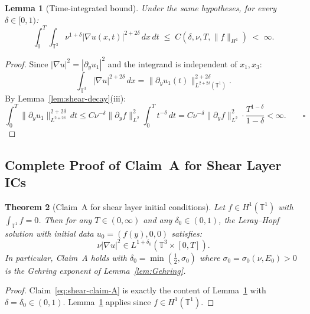 \documentclass[11pt]{article}
\newtheorem{theorem}{Theorem}[section]
\newtheorem{lemma}[theorem]{Lemma}
\theoremstyle{definition}
\theoremstyle{remark}
\newcommand{\T}{\mathbb{T}}
\begin{document}
\begin{lemma}[Time-integrated bound]
\label{lem:shear-Lp}
  Under the same hypotheses, for every $\delta\in[0,1)$:
  \[
    \int_0^T\!\!\int_{\T^3}\nu^{1+\delta}|\nabla u(x,t)|^{2+2\delta}\,dx\,dt
    \;\leq\; C(\delta,\nu,T,\|f\|_{H^1}) \;<\; \infty.
  \]
\end{lemma}

\begin{proof}
  Since $|\nabla u|^2 = |\partial_y u_1|^2$ and the integrand is independent
  of $x_1,x_3$:
  \[
    \int_{\T^3}|\nabla u|^{2+2\delta}\,dx = \|\partial_y u_1(t)\|_{L^{2+2\delta}(\T^1)}^{2+2\delta}.
  \]
  By Lemma~\ref{lem:shear-decay}(iii):
  \[
    \int_0^T\|\partial_y u_1\|_{L^{2+2\delta}}^{2+2\delta}\,dt
    \leq C\nu^{-\delta}\|\partial_y f\|_{L^2}^2
    \int_0^T t^{-\delta}\,dt
    = C\nu^{-\delta}\|\partial_y f\|_{L^2}^2\cdot\frac{T^{1-\delta}}{1-\delta} < \infty.
    \qquad\square
  \]
\end{proof}

\subsection{Complete Proof of Claim~A for Shear Layer ICs}
\label{sec:shear-claimA}

\begin{theorem}[Claim~A for shear layer initial conditions]
\label{thm:shear-claimA}
  Let $f\in H^1(\T^1)$ with $\int_{\T^1}f=0$.
  Then for any $T\in(0,\infty)$ and any $\delta_0\in(0,1)$,
  the Leray--Hopf solution with initial data $u_0=(f(y),0,0)$ satisfies:
  \begin{equation}\label{eq:shear-claim-A}
    \nu|\nabla u|^2 \in L^{1+\delta_0}(\T^3\times[0,T]).
  \end{equation}
  In particular, Claim~A holds with $\delta_0=\min(\tfrac{1}{2},\sigma_0)$
  where $\sigma_0=\sigma_0(\nu,E_0)>0$ is the Gehring exponent of
  Lemma~\ref{lem:Gehring}.
\end{theorem}

\begin{proof}
  Claim~\eqref{eq:shear-claim-A} is exactly the content of
  Lemma~\ref{lem:shear-Lp} with $\delta=\delta_0\in(0,1)$.
  Lemma~\ref{lem:shear-Lp} applies since $f\in H^1(\T^1)$.
\end{proof}
\end{document}
